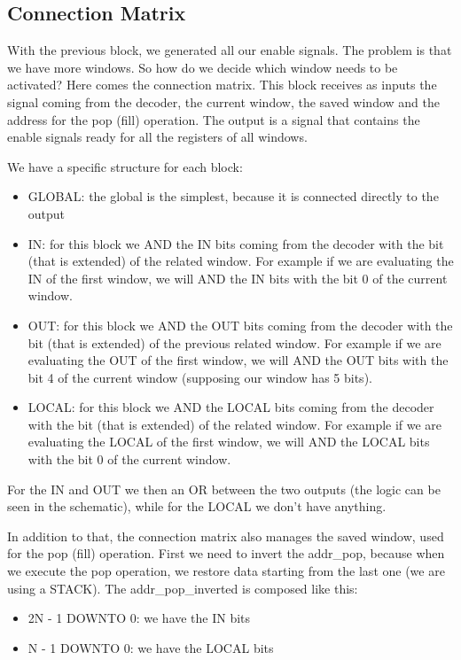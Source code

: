 \subsection{Connection Matrix}

With the previous block, we generated all our enable signals. The problem is that we have more windows. So how do we decide which window needs to be activated? Here comes the connection matrix. This block receives as inputs the signal coming from the decoder, the current window, the saved window and the address for the pop (fill) operation. The output is a signal that contains the enable signals ready for all the registers of all windows. 

We have a specific structure for each block:
\begin{itemize}
  \item GLOBAL: the global is the simplest, because it is connected directly to the output
  \item IN: for this block we AND the IN bits coming from the decoder with the bit (that is extended) of the related window. For example if we are evaluating the IN of the first window, we will AND the IN bits with the bit 0 of the current window.
  \item OUT: for this block we AND the OUT bits coming from the decoder with the bit (that is extended) of the previous related window. For example if we are evaluating the OUT of the first window, we will AND the OUT bits with the bit 4 of the current window (supposing our window has 5 bits).
  \item LOCAL: for this block we AND the LOCAL bits coming from the decoder with the bit (that is extended) of the related window. For example if we are evaluating the LOCAL of the first window, we will AND the LOCAL bits with the bit 0 of the current window.
\end{itemize}

For the IN and OUT we then an OR between the two outputs (the logic can be seen in the schematic), while for the LOCAL we don't have anything.

In addition to that, the connection matrix also manages the saved window, used for the pop (fill) operation. First we need to invert the addr\_pop, because when we execute the pop operation, we restore data starting from the last one (we are using a STACK).
The addr\_pop\_inverted is composed like this:
\begin{itemize}
  \item 2N - 1 DOWNTO 0: we have the IN bits 
  \item N - 1 DOWNTO 0: we have the LOCAL bits
\end{itemize}

